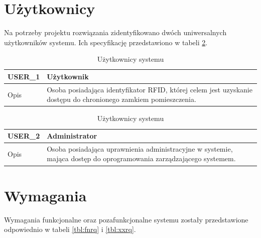     \section{Użytkownicy}
        Na potrzeby projektu rozwiązania zidentyfikowano dwóch uniwersalnych użytkowników systemu. Ich specyfikację przedstawiono w tabeli \ref{tbl:users}.

        \begin{table}[h!]
            \caption{Użytkownicy systemu}
            \centering
            \begin{subtable}[c]{\textwidth}
                \centering
                \begin{tabular}{p{2cm}|p{12cm}}
                    USER\_1      & \textbf{Użytkownik} \\
                    \hline Opis         & Osoba posiadająca identyfikator RFID, której celem jest uzyskanie dostępu do chronionego zamkiem pomieszczenia.  \\
                \end{tabular}
                \label{tbl:usr1}
                \vspace{10mm}           
            \end{subtable}
        \quad%
            \begin{subtable}[c]{\textwidth}
                \centering
                \begin{tabular}{|p{2cm}|p{12cm}|}
                    \hline USER\_2      & \textbf{Administrator} \\
                    \hline \cellcolor[gray]{0.8} Opis         & Osoba posiadająca uprawnienia administracyjne w systemie, mająca dostęp do oprogramowania zarządzającego systemem. \\
                    \hline
                \end{tabular}
                \label{tbl:usr2}       
            \end{subtable}                
            \label{tbl:users}
        \end{table}

    \newpage

    \section{Wymagania}

        Wymagania funkcjonalne oraz pozafunkcjonalne systemu zostały przedstawione odpowiednio w tabeli \ref{tbl:fnrq} i \ref{tbl:xxrq}.

